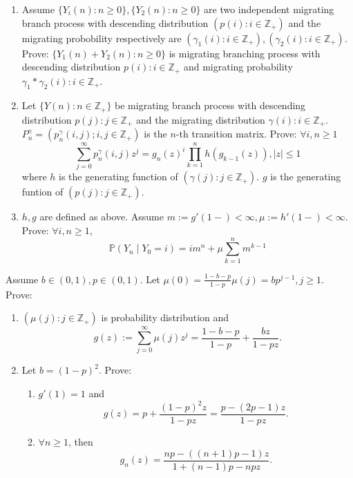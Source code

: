 \documentclass{ctexart}
\newif\ifpreface
\begin{document}
\large
\setlength{\baselineskip}{1.2em}
\ifpreface
  
\else
\fi
{}
\begin{problem}\label{pro:1}
  \begin{enumerate}
    \item   Assume \(\{Y_i(n):n \geq 0\}, \{Y_2(n):n \geq 0\}\) are two independent migrating branch process with descending distribution
      \((p(i):i \in \mathbb{Z}_+)\) and the migrating probobility respectively are \((\gamma_1(i): i \in \mathbb{Z}_{+}),(\gamma_2(i): i \in \mathbb{Z}_+)\).
      Prove: \(\{Y_1(n )+ Y_2(n): n \geq 0\}\) is migrating branching process with descending distribution \(p(i): i \in \mathbb{Z}_+\)
      and migrating probability \(\gamma_1 * \gamma_2(i): i \in \mathbb{Z}_+\).
    \item   Let \(\{Y(n): n \in \mathbb{Z}_+\}\) be migrating branch process with descending distribution \(p(j): j \in \mathbb{Z}_+\)
      and the migrating distribution \(\gamma(i): i \in \mathbb{Z}_+\).
      \(P_n^\gamma=(p_n^\gamma (i,j); i,j \in \mathbb{Z}_+)\) is the \(n\)-th transition matrix.
      Prove: \(\forall i,n \geq 1\)
      \[
        \sum_{j=0}^{\infty} p_n^\gamma(i,j)z^j = g_n(z)^i \prod_{k=1}^{n} h(g_{k-1}(z)), |z| \leq 1
      \]
      where \(h\) is the generating function of \((\gamma(j): j \in \mathbb{Z}_+)\).
      \(g\) is the generating funtion of \((p(j): j \in \mathbb{Z}_+)\).
    \item  \(h,g\) are defined as above. Assume \(m :=g'(1-) < \infty, \mu:=h'(1-) < \infty\).
      Prove: \(\forall i,n \geq 1\), \[
        \mathbb{P}(Y_n \mid Y_0 =i)=im^n + \mu \sum_{k=1}^{n} m^{k-1}
      \]
  \end{enumerate}
\end{problem}
\begin{problem}\label{pro:2}
  Assume \(b \in (0,1), p \in (0,1)\). Let \(\mu(0)=\frac{1-b-p}{1-p}\mu(j)=bp^{j-1},j \geq 1\).
  Prove:
  \begin{enumerate}
    \item   \((\mu(j):j \in \mathbb{Z}_+)\) is probability distribution and \[
        g(z):=\sum_{j=0}^{\infty} \mu(j)z^j=\frac{1-b-p}{1-p} + \frac{bz}{1-pz}.
      \]

    \item Let \(b =(1-p)^2\).
      Prove:
      \begin{enumerate}
        \item   \(g'(1)=1\) and \[
            g(z)=p + \frac{(1-p)^2 z}{1-pz}=\frac{p-(2p-1)z}{1-pz}.
          \]
        \item \(\forall n \geq 1\), then \[
            g_n(z)=\frac{np-((n + 1)p-1)z}{1 + (n-1)p-npz}.
          \]
      \end{enumerate}
  \end{enumerate}
\end{problem}
\end{document}
